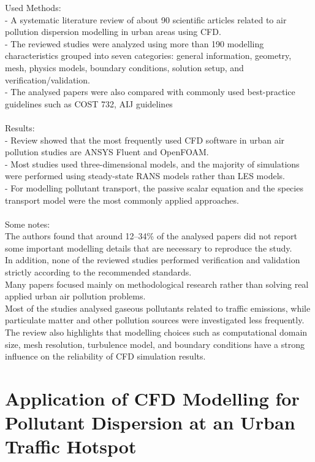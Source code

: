 \documentclass[12pt,a4paper]{article}
\begin{document}
Used Methods: \\
- A systematic literature review of about 90 scientific articles related to air pollution dispersion modelling in urban areas using CFD. \\
- The reviewed studies were analyzed using more than 190 modelling characteristics grouped into seven categories: general information, geometry, mesh, physics models, boundary conditions, solution setup, and verification/validation. \\
- The analysed papers were also compared with commonly used best-practice guidelines such as COST 732, AIJ guidelines \\
\\

Results: \\
- Review showed that the most frequently used CFD software in urban air pollution studies are ANSYS Fluent and OpenFOAM. \\
- Most studies used three-dimensional models, and the majority of simulations were performed using steady-state RANS models rather than LES models. \\
- For modelling pollutant transport, the passive scalar equation and the species transport model were the most commonly applied approaches. \\
\\

Some notes:\\
The authors found that around 12--34\% of the analysed papers did not report some important modelling details that are necessary to reproduce the study. \\
In addition, none of the reviewed studies performed verification and validation strictly according to the recommended standards. \\
Many papers focused mainly on methodological research rather than solving real applied urban air pollution problems. \\
Most of the studies analysed gaseous pollutants related to traffic emissions, while particulate matter and other pollution sources were investigated less frequently. \\
The review also highlights that modelling choices such as computational domain size, mesh resolution, turbulence model, and boundary conditions have a strong influence on the reliability of CFD simulation results. \\

\section{Application of CFD Modelling for Pollutant Dispersion at an
Urban Traffic Hotspot}
\end{document}
